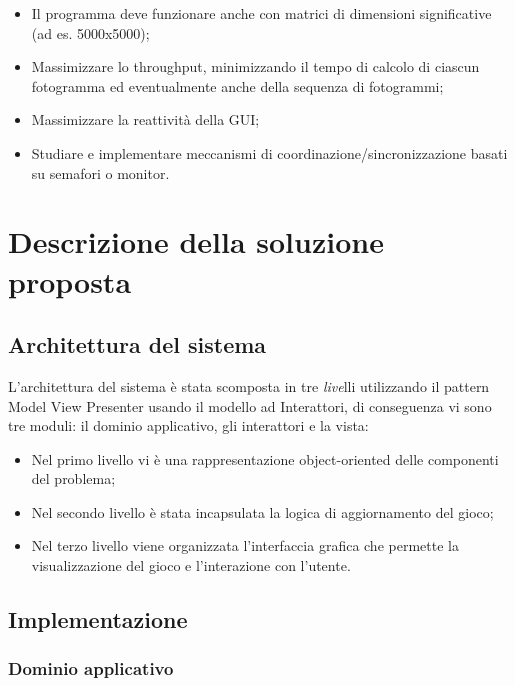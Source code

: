 \documentclass[a4paper]{article}
\begin{document}
\begin{itemize}
\item
  Il programma deve funzionare anche con matrici di dimensioni significative (ad es. 5000x5000);
\item
  Massimizzare lo throughput, minimizzando il tempo di calcolo di ciascun fotogramma ed eventualmente anche della sequenza di fotogrammi;
\item
  Massimizzare la reattività della GUI;
\item
  Studiare e implementare meccanismi di coordinazione/sincronizzazione basati su semafori o monitor.
\end{itemize}

\section{Descrizione della soluzione
proposta}\label{descrizione-della-soluzione-proposta}

\subsection{Architettura del sistema}\label{architettura-del-sistema}

L'architettura del sistema è stata scomposta in tre \emph{live}lli utilizzando il pattern Model View Presenter usando il modello ad Interattori, di conseguenza vi sono tre moduli: il dominio applicativo, gli interattori e la vista:

\begin{itemize}
\item
  Nel primo livello vi è una rappresentazione object-oriented delle componenti del problema;
\item
  Nel secondo livello è stata incapsulata la logica di aggiornamento del gioco;
\item
  Nel terzo livello viene organizzata l'interfaccia grafica che permette la visualizzazione del gioco e l'interazione con l'utente.
\end{itemize}

\subsection{Implementazione}\label{implementazione}

\subsubsection{Dominio applicativo}\label{dominio-applicativo}
\end{document}
